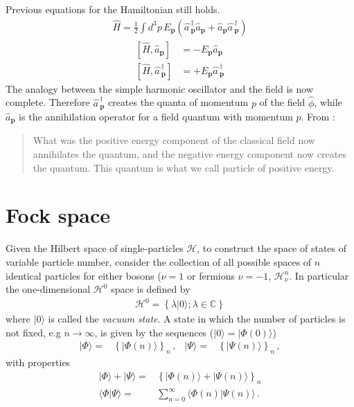 \begin{frame}
Previous equations for the Hamiltonian still holds. 
\begin{align}
  \widehat{H}=\frac{1}{2}\int d^3p\,E_{\mathbf{p}}\left(\widehat{a\,}_{\mathbf{p}}^\dagger\widehat{a}_{\mathbf{p}}
+\widehat{a}_{\mathbf{p}}\widehat{a\,}_{\mathbf{p}}^\dagger\right)
\end{align}
\begin{align}
  \left[\widehat{H},\widehat{a}_{\mathbf{p}}\right]&=-E_{\mathbf{p}}\widehat{a}_{\mathbf{p}}\nonumber\\
  \left[\widehat{H},\widehat{a\,}_{\mathbf{p}}^\dagger \right]&=+E_{\mathbf{p}}\widehat{a\,}_{\mathbf{p}}^\dagger
\end{align}
The analogy between the simple harmonic oscillator and the field is now complete. Therefore $\widehat{a\,}_{\mathbf{p}}^\dagger$ creates the quanta of momentum $p$ of the field $\widehat{\phi}$, while $\widehat{a}_{\mathbf{p}}$ is the annihilation operator for a field quantum with momentum $p$. From \cite{Lahiri:2005sm}:
\begin{quote}
  What was the positive energy component of the classical field now annihilates the quantum, and the negative energy component now creates the quantum. This quantum is what we call particle of positive energy.
\end{quote}
\end{frame}

\section{Fock space}


Given the Hilbert space of single-particles $\mathcal{H}$, to construct the space of states of variable particle number, consider the collection of all possible spaces of $n$ identical particles for either bosons ($\nu=1$ or fermions $\nu=-1$, $\mathcal{H}^n_{\nu}$. In particular the one-dimensional $\mathcal{H}^0$ space is defined by
\begin{align}
  \mathcal{H}^0=\left\{ \lambda|0\rangle;\lambda\in \mathbb{C} \right\}
\end{align}
where   $|0\rangle$ is called the \emph{vacuum state}.
A state in which the number of particles is not fixed, e.g $n\to\infty$, is given by the sequences ($|0\rangle=|\Phi(0)\rangle$)
\begin{align}
\label{eq:fffs}
  |\Phi\rangle=&\left\{ |\Phi(n)\rangle \right\}_n\,,&  |\Psi\rangle=&\left\{ |\Psi(n)\rangle \right\}_n\,,
\end{align}
with properties
\begin{align}
  |\Phi\rangle+|\Psi\rangle=&\left\{ |\Phi(n)\rangle+|\Psi(n)\rangle \right\}_n \nonumber\\
\langle\Phi|\Psi\rangle=&\sum_{n=0}^{\infty}\langle\Phi(n)|\Psi(n)\rangle\,.
\end{align}

